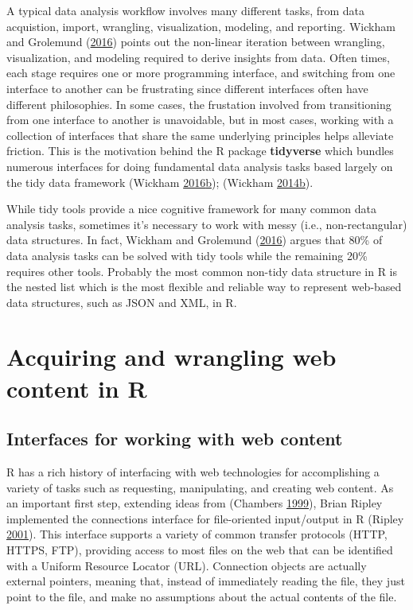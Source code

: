\documentclass[12pt,]{isuthesis}
\begin{document}
A typical data analysis workflow involves many different tasks, from
data acquistion, import, wrangling, visualization, modeling, and
reporting. Wickham and Grolemund (\protect\hyperlink{ref-r4ds}{2016})
points out the non-linear iteration between wrangling, visualization,
and modeling required to derive insights from data. Often times, each
stage requires one or more programming interface, and switching from one
interface to another can be frustrating since different interfaces often
have different philosophies. In some cases, the frustation involved from
transitioning from one interface to another is unavoidable, but in most
cases, working with a collection of interfaces that share the same
underlying principles helps alleviate friction. This is the motivation
behind the R package \textbf{tidyverse} which bundles numerous
interfaces for doing fundamental data analysis tasks based largely on
the tidy data framework (Wickham
\protect\hyperlink{ref-tidyverse}{2016}\protect\hyperlink{ref-tidyverse}{b});
(Wickham
\protect\hyperlink{ref-tidy-data}{2014}\protect\hyperlink{ref-tidy-data}{b}).

While tidy tools provide a nice cognitive framework for many common data
analysis tasks, sometimes it's necessary to work with messy (i.e.,
non-rectangular) data structures. In fact, Wickham and Grolemund
(\protect\hyperlink{ref-r4ds}{2016}) argues that 80\% of data analysis
tasks can be solved with tidy tools while the remaining 20\% requires
other tools. Probably the most common non-tidy data structure in R is
the nested list which is the most flexible and reliable way to represent
web-based data structures, such as JSON and XML, in R.

\section{Acquiring and wrangling web content in
R}\label{acquiring-and-wrangling-web-content-in-r}

\subsection{Interfaces for working with web
content}\label{interfaces-for-working-with-web-content}

R has a rich history of interfacing with web technologies for
accomplishing a variety of tasks such as requesting, manipulating, and
creating web content. As an important first step, extending ideas from
(Chambers \protect\hyperlink{ref-Chambers:1999}{1999}), Brian Ripley
implemented the connections interface for file-oriented input/output in
R (Ripley \protect\hyperlink{ref-Connections}{2001}). This interface
supports a variety of common transfer protocols (HTTP, HTTPS, FTP),
providing access to most files on the web that can be identified with a
Uniform Resource Locator (URL). Connection objects are actually external
pointers, meaning that, instead of immediately reading the file, they
just point to the file, and make no assumptions about the actual
contents of the file.
\end{document}

